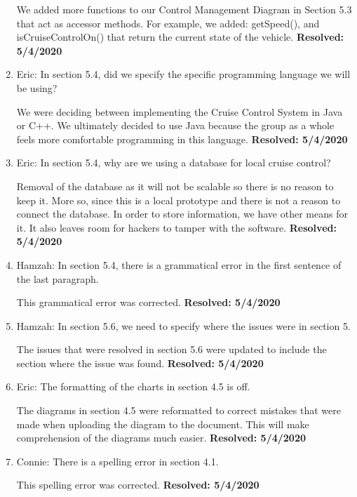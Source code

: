 \documentclass[preprint,11pt,3p]{article}
\begin{document}
\begin{enumerate}
			We added more functions to our Control Management Diagram in Section 5.3 that act as accessor methods. For example, we added: getSpeed(), and isCruiseControlOn() that return the current state of the vehicle. \textbf{Resolved: 5/4/2020}
	\item Eric: In section 5.4, did we specify the specific programming language we will be using?\par
			We were deciding between implementing the Cruise Control System in Java or C++. We ultimately decided to use Java because the group as a whole feels more comfortable programming in this language. \textbf{Resolved: 5/4/2020}
	\item Eric: In section 5.4, why are we using a database for local cruise control?\par
			Removal of the database as it will not be scalable so there is no reason to keep it. More so, since this is a local prototype and there is not a reason to connect the database. In order to store information, we have other means for it. It also leaves room for hackers to tamper with the software. \textbf{Resolved: 5/4/2020}
	\item Hamzah: In section 5.4, there is a grammatical error in the first sentence of the last paragraph.\par
			This grammatical error was corrected. \textbf{Resolved: 5/4/2020}
	\item Hamzah: In section 5.6, we need to specify where the issues were in section 5.\par
			The issues that were resolved in section 5.6 were updated to include the section where the issue was found. \textbf{Resolved: 5/4/2020}
	\item Eric: The formatting of the charts in section 4.5 is off.\par
			The diagrams in section 4.5 were reformatted to correct mistakes that were made when uploading the diagram to the document. This will make comprehension of the diagrams much easier. \textbf{Resolved: 5/4/2020}
	\item Connie: There is a spelling error in section 4.1.\par
			This spelling error was corrected. \textbf{Resolved: 5/4/2020}
\end{enumerate}
\end{document}
